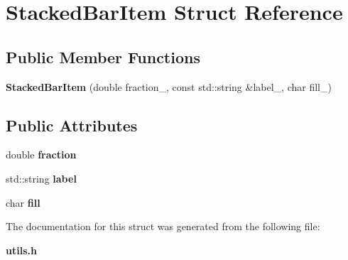 \section{Stacked\+Bar\+Item Struct Reference}
\label{structStackedBarItem}
\subsection*{Public Member Functions}
\begin{DoxyCompactItemize}
\item 
\mbox{\label{structStackedBarItem_ae45d094b71f3bd8e3f64002ec66d48bd}} 
{\bfseries Stacked\+Bar\+Item} (double fraction\+\_\+, const std\+::string \&label\+\_\+, char fill\+\_\+)
\end{DoxyCompactItemize}
\subsection*{Public Attributes}
\begin{DoxyCompactItemize}
\item 
\mbox{\label{structStackedBarItem_a81e70330094960d24c2b507fc3361396}} 
double {\bfseries fraction}
\item 
\mbox{\label{structStackedBarItem_a47ea040bac0fef2397a86141ea8953c0}} 
std\+::string {\bfseries label}
\item 
\mbox{\label{structStackedBarItem_aa921496f0aa1ab85137e7c606bc4109b}} 
char {\bfseries fill}
\end{DoxyCompactItemize}


The documentation for this struct was generated from the following file\+:\begin{DoxyCompactItemize}
\item 
\textbf{ utils.\+h}\end{DoxyCompactItemize}
